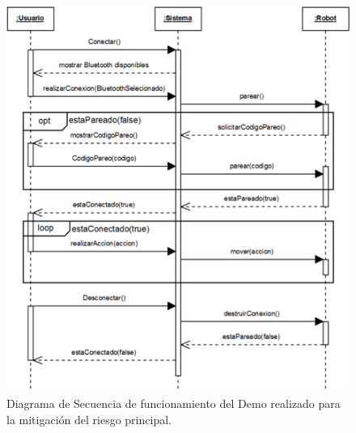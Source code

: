 \documentclass[letterpaper,12pt]{article} %
\numberwithin{equation}{section} %
\numberwithin{figure}{section} %
\numberwithin{table}{section} %
\begin{document}
\begin{figure}[H]
   \centering
     \includegraphics[scale=1]{DiagramaSecuencia_v01.png}
   \caption{Diagrama de Secuencia de funcionamiento del Demo realizado para la mitigaci\'on del riesgo principal.}
   \label{img:diagrama}
\end{figure}
\end{document}

